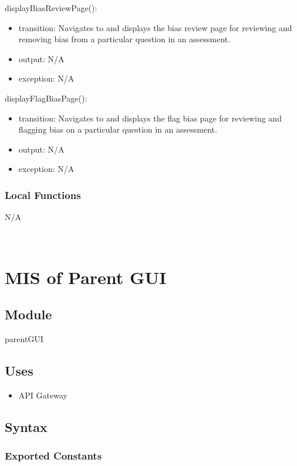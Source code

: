 \documentclass[12pt, titlepage]{article}
\begin{document}
\noindent displayBiasReviewPage():
\begin{itemize}
\item transition: Navigates to and displays the bias review page for reviewing and removing bias from a particular question in an assessment.
\item output: N/A
\item exception: N/A
\end{itemize}

\noindent displayFlagBiasPage():
\begin{itemize}
\item transition: Navigates to and displays the flag bias page for reviewing and flagging bias on a particular question in an assessment.
\item output: N/A
\item exception: N/A
\end{itemize}

\subsubsection{Local Functions}
N/A

~\newpage
\section{MIS of Parent GUI \label{mParentGUI} }

\subsection{Module}

parentGUI

\subsection{Uses}

\begin{itemize}
  \item API Gateway
\end{itemize}

\subsection{Syntax}

\subsubsection{Exported Constants}
\end{document}
